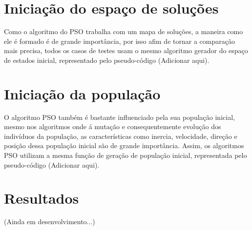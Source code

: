 \section{Iniciação do espaço de soluções}
Como o algoritmo do PSO trabalha com um mapa de soluções, a maneira como ele é formado é de grande importância, por isso afim de tornar a comparação mais precisa, todos os casos de testes usam o mesmo algoritmo gerador do espaço de estados inicial, representado pelo pseudo-código (Adicionar aqui).

\section{Iniciação da população}
O algoritmo PSO também é bastante influenciado pela sua população inicial, mesmo nos algoritmos onde á mutação e consequentemente evolução dos indivíduos da população, as características como inercia, velocidade, direção e posição dessa população inicial são de grande importância. Assim, os algoritmos PSO utilizam a mesma função de geração de população inicial, representada pelo pseudo-código (Adicionar aqui).

\section{Resultados}
(Ainda em desenvolvimento...)
\lipsum[1]